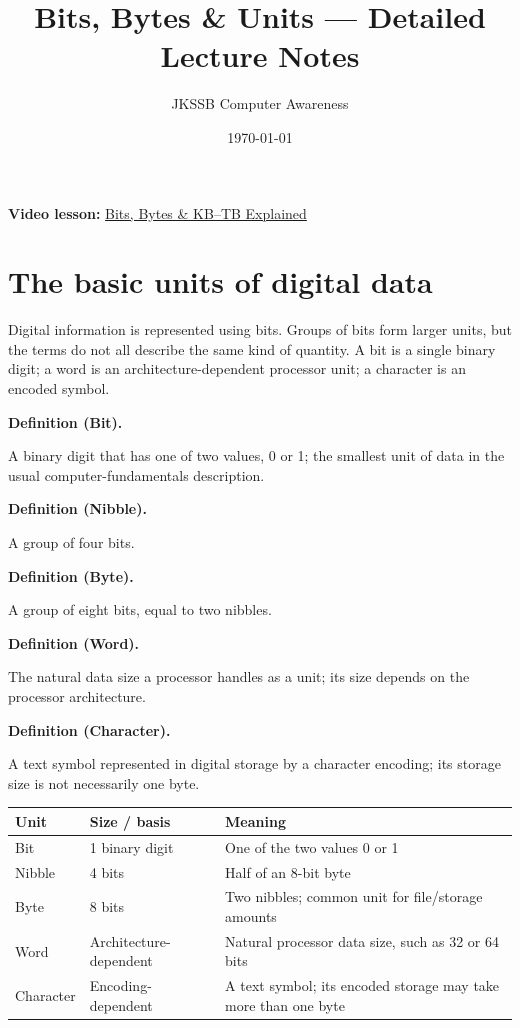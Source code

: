 \documentclass[11pt]{article}
\title{Bits, Bytes \& Units --- Detailed Lecture Notes}
\author{JKSSB Computer Awareness}
\date{\today}
\newenvironment{definitionbox}[1]{%
  \par\noindent\textbf{Definition (#1).}\ \itshape
}{\par\vspace{0.3em}}
\begin{document}
\maketitle
\noindent\textbf{Video lesson:}
\href{https://youtu.be/j_62CGCBElo}{Bits, Bytes \& KB--TB Explained}

\section{The basic units of digital data}
Digital information is represented using bits. Groups of bits form larger
units, but the terms do not all describe the same kind of quantity. A bit is
a single binary digit; a word is an architecture-dependent processor unit;
a character is an encoded symbol.

\begin{definitionbox}{Bit}
A binary digit that has one of two values, 0 or 1; the smallest unit of data
in the usual computer-fundamentals description.
\end{definitionbox}

\begin{definitionbox}{Nibble}
A group of four bits.
\end{definitionbox}

\begin{definitionbox}{Byte}
A group of eight bits, equal to two nibbles.
\end{definitionbox}

\begin{definitionbox}{Word}
The natural data size a processor handles as a unit; its size depends on the
processor architecture.
\end{definitionbox}

\begin{definitionbox}{Character}
A text symbol represented in digital storage by a character encoding; its
storage size is not necessarily one byte.
\end{definitionbox}

\begin{center}
\begin{tabular}{p{}p{}p{}}
\toprule
\textbf{Unit} & \textbf{Size / basis} & \textbf{Meaning}\\
\midrule
Bit & 1 binary digit & One of the two values 0 or 1\\
Nibble & 4 bits & Half of an 8-bit byte\\
Byte & 8 bits & Two nibbles; common unit for file/storage amounts\\
Word & Architecture-dependent & Natural processor data size, such as 32 or 64 bits\\
Character & Encoding-dependent & A text symbol; its encoded storage may take more than one byte\\
\bottomrule
\end{tabular}
\end{center}
\end{document}
